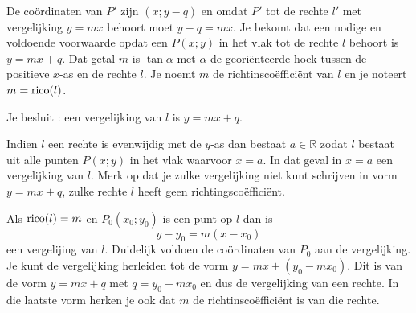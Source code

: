 De co\"ordinaten van $P'$ zijn $(x;y-q)$ en omdat $P'$ tot de rechte $l'$ met vergelijking $y=mx$ behoort moet $y-q=mx$.
Je bekomt dat een nodige en voldoende voorwaarde opdat een $P(x;y)$ in het vlak tot de rechte $l$ behoort is $y=mx+q$.
Dat getal $m$ is $\tan \alpha$ met $\alpha$ de geori\"enteerde hoek tussen de positieve $x$-as en de rechte $l$.
Je noemt $m$ de richtinsco\"effici\"ent van $l$ en je noteert $m=\operatorname{rico} (l)$.

Je besluit : een vergelijking van $l$ is $y=mx+q$.

Indien $l$ een rechte is evenwijdig met de $y$-as dan bestaat $a \in \mathbb{R}$ zodat $l$ bestaat uit alle punten $P(x;y)$ in het vlak waarvoor $x=a$.
In dat geval in $x=a$ een vergelijking van $l$.
Merk op dat je zulke vergelijking niet kunt schrijven in vorm $y=mx+q$, zulke rechte $l$ heeft geen richtingsco\"effici\"ent.

\begin{opmerking}
	Als $\operatorname{rico}(l)=m$ en $P_0(x_0;y_0)$ is een punt op $l$ dan is
\[
y-y_0=m(x-x_0)
\]
een vergelijing van $l$.
Duidelijk voldoen de co\"ordinaten van $P_0$ aan de vergelijking.
Je kunt de vergelijking herleiden tot de vorm $y=mx+(y_0-mx_0)$.
Dit is van de vorm $y=mx+q$ met $q=y_0-mx_0$ en dus de vergelijking van een rechte.
In die laatste vorm herken je ook dat $m$ de richtinsco\"effici\"ent is van die rechte.\\
\end{opmerking}

%
%
%
%
%

